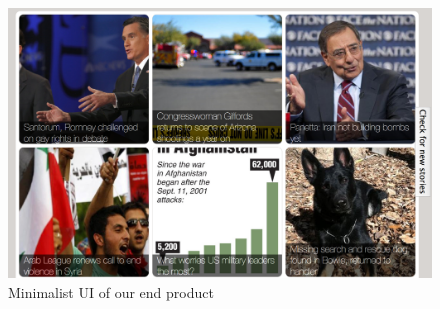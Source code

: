 \documentclass{report}
\begin{document}
	\begin{figure}
	 \includegraphics[scale=0.29]{screen1.png}
	 \caption{\label{fig:screen1} Minimalist UI of our end product}
	\end{figure}	
	
	
\end{document}
